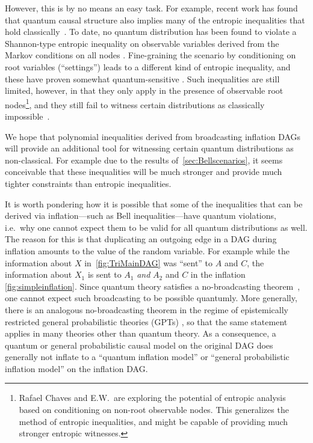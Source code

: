 However, this is by no means an easy task. For example, recent work has found that quantum causal structure also implies many of the entropic inequalities that hold classically~\cite{pusey2014gdag,Chaves2015infoquantum,ChavesNoSignalling}. To date, no quantum distribution has been found to violate a Shannon-type entropic inequality on observable variables derived from the Markov conditions on all nodes \cite{chaves2012entropic,fritz2012bell}. Fine-graining the scenario by conditioning on root variables (``settings'') leads to a different kind of entropic inequality, and these have proven somewhat quantum-sensitive \cite{braunstein1988entropic,SchumacherInequality,chaves2014novel}. Such inequalities are still limited, however, in that they only apply in the presence of observable root nodes\footnote{Rafael Chaves and E.W.~are exploring the potential of entropic analysis based on conditioning on non-root observable nodes. This generalizes the method of entropic inequalities, and might be capable of providing much stronger entropic witnesses.}, and they still fail to witness certain distributions as classically impossible~\cite{chaves2014novel,fritz2012bell}.

We hope that polynomial inequalities derived from broadcasting inflation DAGs will provide an additional tool for witnessing certain quantum distributions as non-classical. For example due to the results of~\cref{sec:Bellscenarios}, it seems conceivable that these inequalities will be much stronger and provide much tighter constraints than entropic inequalities.

It is worth pondering how it is possible that some of the inequalities that can be derived via inflation---such as Bell inequalities---have quantum violations, i.e.~why one cannot expect them to be valid for all quantum distributions as well. The reason for this is that duplicating an outgoing edge in a DAG during inflation amounts to  the value of the random variable. For example while the information about $X$ in~\cref{fig:TriMainDAG} was ``sent'' to $A$ and $C$, the information about $X_1$ is sent to $A_1$ \emph{and} $A_2$ and $C$ in the inflation \cref{fig:simpleinflation}. Since quantum theory satisfies a no-broadcasting theorem~\cite{NoCloningQuantum1996,NoCloningGeneral2006}, one cannot expect such broadcasting to be possible quantumly. More generally, there is an analogous no-broadcasting theorem in the regime of epistemically restricted general probabilistic theories (GPTs) \cite{SpekkensToyTheory,NoCloningGeneral2006,Barnum2012GPT,Janotta2014GPT}, so that the same statement applies in many theories other than quantum theory. As a consequence, a quantum or general probabilistic causal model on the original DAG does generally not inflate to a ``quantum inflation model'' or ``general probabilistic inflation model'' on the inflation DAG. 

